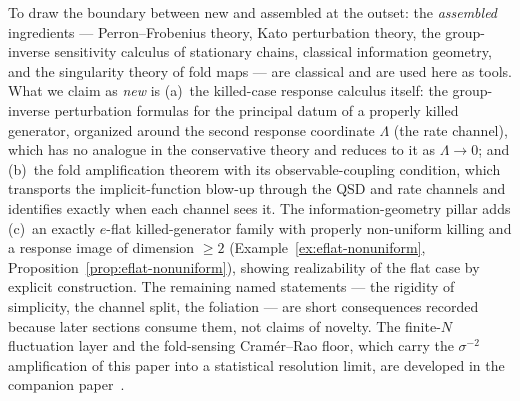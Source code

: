 \documentclass[11pt,reqno]{amsart}
\theoremstyle{plain}
\theoremstyle{definition}
\theoremstyle{remark}
\begin{document}
To draw the boundary between new and assembled at the outset: the
\emph{assembled} ingredients --- Perron--Frobenius theory, Kato perturbation
theory, the group-inverse sensitivity calculus of stationary chains, classical
information geometry, and the singularity theory of fold maps --- are classical
and are used here as tools. What we claim as \emph{new} is (a)~the killed-case
response calculus itself: the group-inverse perturbation formulas for the
principal datum of a properly killed generator, organized around the second
response coordinate $\Lambda$ (the rate channel), which has no analogue in the
conservative theory and reduces to it as $\Lambda\to0$; and (b)~the fold
amplification theorem with its observable-coupling condition, which transports
the implicit-function blow-up through the QSD and rate channels and identifies
exactly when each channel sees it. The information-geometry pillar adds (c)~an exactly
$e$-flat killed-generator family with properly non-uniform killing and a response image
of dimension $\ge2$ (Example~\ref{ex:eflat-nonuniform}, Proposition~\ref{prop:eflat-nonuniform}),
showing realizability of the flat case by explicit construction. The remaining named statements
--- the rigidity of simplicity, the channel split, the foliation --- are short
consequences recorded because later sections consume them, not claims of
novelty. The finite-$N$ fluctuation layer and the fold-sensing Cram\'er--Rao floor,
which carry the $\sigma^{-2}$ amplification of this paper into a statistical
resolution limit, are developed in the companion paper~\cite{SarkarFoldSensing}.
\end{document}
